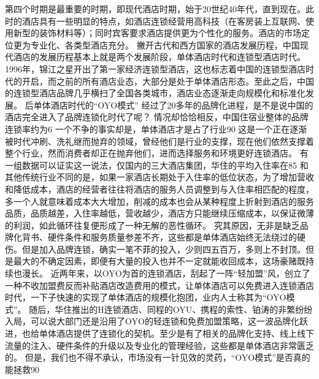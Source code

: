 {{{{{{{{{{{{{{第四个时期是最重要的时期，即现代酒店时期，始于20世纪40年代，直到现在。此时的酒店具有一些明显的特点，如酒店连锁经营用高科技（在客房装上互联网、使用新型的装饰材料等）；同时宾客要求酒店提供更为个性化的服务。酒店的市场定位更为专业化、各类型酒店充分。
撇开古代和西方国家的酒店发展历程，中国现代酒店的发展历程基本上就是两个发展阶段，单体酒店时代和连锁型酒店时代。
1996年，锦江之星开出了第一家经济连锁型酒店，这也标志着中国的连锁型酒店时代的开启，而之前的所有酒店业态，大部分是处于单体酒店形态。至此之后，中国的连锁型酒店品牌几乎横扫了全国各类城市，酒店业态逐渐走向规模化和标准化发展。
后单体酒店时代的“OYO模式”
经过了20多年的品牌化进程，是不是说中国的酒店完全进入了品牌连锁化时代了呢？
情况却恰恰相反，中国住宿业整体的品牌连锁率约为6%
一个不争的事实却是，单体酒店才是占了行业90%
这是一个正在逐渐被时代冲刷、洗礼继而抛弃的领域，曾经他们是行业的支撑，现在他们依然支撑着整个行业，然而消费者却正在抛弃他们，进而选择服务和环境更好连锁酒店。
有一组数据可以证实这一说法，仅国内的三大酒店集团，华住的平均入住率在85%
和其他传统行业不同的是，如果一家酒店长期处于入住率的低位状态，为了增加营收和降低成本，酒店的经营者往往将酒店的服务人员调整到与入住率相匹配的程度，多一个人就意味着成本大大增加，削减的成本也会从某种程度上折射到酒店的服务品质，品质越差，入住率越低，营收越少，酒店方只能继续压缩成本，以保证微薄的利润，如此循环往复便形成了一种无解的恶性循环。
究其原因，无非是缺乏品牌化背书、硬件条件和服务质量参差不齐，这些都是单体酒店始终无法绕过的硬伤。但是加入品牌连锁，确实一笔不菲的投入，少则四五百万，多则上不封顶。但是最大的不确定因素，即便有大量的投入也并不一定就能收回成本，这场豪赌既持续也漫长。
近两年来，以OYO为首的连锁酒店，刮起了一阵“轻加盟”风，创立了一种不收加盟费反而补贴酒店改造费用的模式，让单体酒店可以免费进入连锁酒店时代，一下子快速的实现了单体酒店的规模化抱团，业内人士称其为“OYO模式”。
随后，华住推出的H连锁酒店、同程的OYU、携程的索性、铂涛的非繁纷纷入局，可以说大部门还是沿用了OYO的轻连锁和免费加盟策略，这一波品牌化跃进，也给单体酒店提供了连锁化的契机。至少是有了相关的品牌化支持、线上线下流量的注入、硬件条件的升级以及专业化的管理经验，这些都是单体酒店非常匮乏的。
但是，我们也不得不承认，市场没有一针见效的灵药，“OYO模式”是否真的能拯救90%


}}}}}}}}}}}}}}
